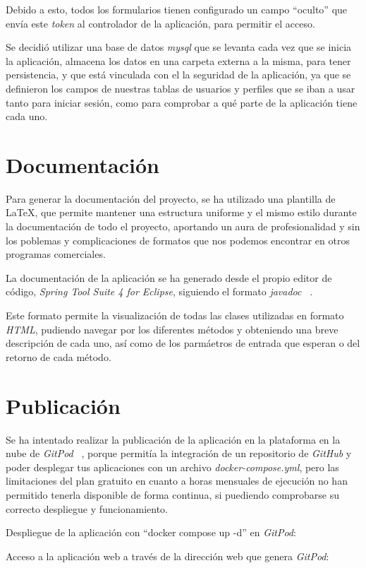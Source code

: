 Debido a esto, todos los formularios tienen configurado un campo ``oculto'' que envía este \textit{token} al controlador de la aplicación, para permitir el acceso.

Se decidió utilizar una base de datos \textit{mysql} que se levanta cada vez que se inicia la aplicación, almacena los datos en una carpeta externa a la misma, para tener persistencia, y que está vinculada con el la seguridad de la aplicación, ya que se definieron los campos de nuestras tablas de usuarios y perfiles que se iban a usar tanto para iniciar sesión, como para comprobar a qué parte de la aplicación tiene cada uno.

\section{Documentación}

Para generar la documentación del proyecto, se ha utilizado una plantilla de \LaTeX, que permite mantener una estructura uniforme y el mismo estilo durante la documentación de todo el proyecto, aportando un aura de profesionalidad y sin los poblemas y complicaciones de formatos que nos podemos encontrar en otros programas comerciales.

La documentación de la aplicación se ha generado desde el propio editor de código, \textit{Spring Tool Suite 4 for Eclipse}, siguiendo el formato \textit{javadoc} ~\cite{doc:javadoc}.

Este formato permite la visualización de todas las clases utilizadas en formato \textit{HTML}, pudiendo navegar por los diferentes métodos y obteniendo una breve descripción de cada uno, así como de los parmáetros de entrada que esperan o del retorno de cada método.
\clearpage
\section{Publicación}

Se ha intentado realizar la publicación de la aplicación en la plataforma en la nube de \textit{GitPod} ~\cite{gitpod}, porque permitía la integración de un repositorio de \textit{GitHub} y poder desplegar tus aplicaciones con un archivo \textit{docker-compose.yml}, pero las limitaciones del plan gratuito en cuanto a horas mensuales de ejecución no han permitido tenerla disponible de forma continua, si puediendo comprobarse su correcto despliegue y funcionamiento.

Despliegue de la aplicación con ``docker compose up -d'' en \textit{GitPod}:

Acceso a la aplicación web a través de la dirección web que genera \textit{GitPod}:





